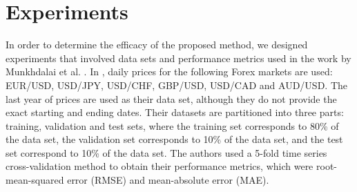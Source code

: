 \documentclass{ieeeaccess}
\begin{document}







\section{Experiments}
\label{section:experiments}

In order to determine the efficacy of the proposed method, we designed
experiments that involved data sets and performance metrics used in
the work by Munkhdalai et al. \cite{Munkhdalai2019}. In
\cite{Munkhdalai2019}, daily prices for the following Forex markets
are used: EUR/USD, USD/JPY, USD/CHF, GBP/USD, USD/CAD and AUD/USD. The last
year of prices are used as their data set, although they do not
provide the exact starting and ending dates. Their datasets are
partitioned into three parts: training, validation and test sets,
where the training set corresponds to 80\% of the data set, the
validation set corresponds to 10\% of the data set, and the test set
correspond to 10\% of the data set. The authors used a 5-fold time
series cross-validation method to obtain their performance metrics,
which were root-mean-squared error (RMSE) and mean-absolute error (MAE).
\end{document}
